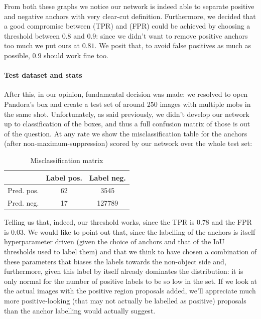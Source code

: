 \documentclass[10pt,journal,cspaper,compsoc]{IEEEtran}
\begin{document}
    From both these graphs we notice our network is indeed able to separate positive and negative anchors with very clear-cut definition. Furthermore, we decided that a good compromise between (TPR) and (FPR) could be achieved by choosing a threshold between $0.8$ and $0.9$: since we didn't want to remove positive anchors too much we put ours at $0.81$. We posit that, to avoid false positives as much as possible, $0.9$ should work fine too.

    \paragraph*{Test dataset and stats} After this, in our opinion, fundamental decision was made: we resolved to open Pandora's box and create a test set of around 250 images with multiple mobs in the same shot. Unfortunately, as said previously, we didn't develop our network up to classification of the boxes, and thus a full confusion matrix of those is out of the question. At any rate we show the misclassification table for the anchors (after non-maximum-suppression) scored by our network over the whole test set:

    \begin{table}[htb]
        \centering
        \caption{Misclassification matrix}
        \begin{tabularx}{.3\textwidth}{r|c c}\label{tab:miscl}
            & Label pos. & Label neg. \\
            \hline
            Pred. pos. & 62 & 3545 \\
            Pred. neg. & 17 & 127789
        \end{tabularx}
    \end{table}

    Telling us that, indeed, our threshold works, since the TPR is $0.78$ and the FPR is $0.03$. We would like to point out that, since the labelling of the anchors is itself hyperparameter driven (given the choice of anchors and that of the IoU thresholds used to label them) and that we think to have chosen a combination of these parameters that biases the labels towards the non-object side and, furthermore, given this label by itself already dominates the distribution: it is only normal for the number of positive labels to be so low in the set. If we look at the actual images with the positive region proposals added, we'll appreciate much more positive-looking (that may not actually be labelled as positive) proposals than the anchor labelling would actually suggest.
\end{document}
